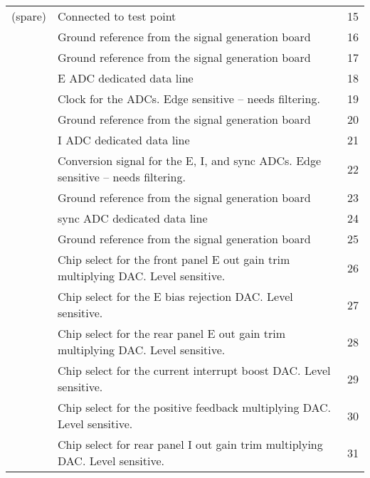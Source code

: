 \begin{center}
\begin{longtable}{c >{\scriptsize}p{8cm} c}
(spare)
&Connected to test point
&15\\

\verb80V_dig8
&Ground reference from the signal generation board
&16\\

\verb80V_dig8
&Ground reference from the signal generation board
&17\\

\verb8e_adc_data8
&E ADC dedicated data line
&18\\

\verb8adc_clk8
&Clock for the ADCs.  Edge sensitive -- needs filtering.
&19\\

\verb80V_dig8
&Ground reference from the signal generation board
&20\\

\verb8i_adc_data8
&I ADC dedicated data line
&21\\

\verb8adc_convert8
&Conversion signal for the E, I, and sync ADCs.  Edge sensitive -- needs filtering.
&22\\

\verb80V_dig8
&Ground reference from the signal generation board
&23\\

\verb8sync_adc_data8
&sync ADC dedicated data line
&24\\

\verb80V_dig8
&Ground reference from the signal generation board
&25\\

\verb8fp_egain_cs8
&Chip select for the front panel E out gain trim multiplying DAC.  Level sensitive.
&26\\

\verb8ebias_cs8
&Chip select for the E bias rejection DAC.  Level sensitive.
&27\\

\verb8rp_egain_cs8
&Chip select for the rear panel E out gain trim multiplying DAC. Level sensitive.
&28\\

\verb8boost_dac_cs8
&Chip select for the current interrupt boost DAC. Level sensitive.
&29\\

\verb8pos_fbck_cs8
&Chip select for the positive feedback multiplying DAC. Level sensitive.
&30\\

\verb8rp_igain_cs8
&Chip select for rear panel I out gain trim multiplying DAC. Level sensitive.
&31\\


\end{longtable}
\end{center}
